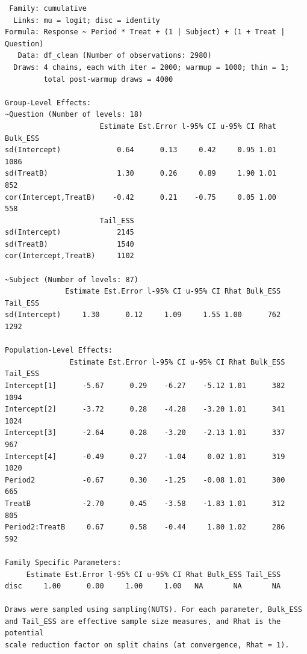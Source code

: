 \documentclass[
  12pt,
  a4paper,
  extrafontsizes,
  onecolumn,
  openright]{memoir}
\begin{document}
\begin{verbatim}
 Family: cumulative 
  Links: mu = logit; disc = identity 
Formula: Response ~ Period * Treat + (1 | Subject) + (1 + Treat | Question) 
   Data: df_clean (Number of observations: 2980) 
  Draws: 4 chains, each with iter = 2000; warmup = 1000; thin = 1;
         total post-warmup draws = 4000

Group-Level Effects: 
~Question (Number of levels: 18) 
                      Estimate Est.Error l-95% CI u-95% CI Rhat Bulk_ESS
sd(Intercept)             0.64      0.13     0.42     0.95 1.01     1086
sd(TreatB)                1.30      0.26     0.89     1.90 1.01      852
cor(Intercept,TreatB)    -0.42      0.21    -0.75     0.05 1.00      558
                      Tail_ESS
sd(Intercept)             2145
sd(TreatB)                1540
cor(Intercept,TreatB)     1102

~Subject (Number of levels: 87) 
              Estimate Est.Error l-95% CI u-95% CI Rhat Bulk_ESS Tail_ESS
sd(Intercept)     1.30      0.12     1.09     1.55 1.00      762     1292

Population-Level Effects: 
               Estimate Est.Error l-95% CI u-95% CI Rhat Bulk_ESS Tail_ESS
Intercept[1]      -5.67      0.29    -6.27    -5.12 1.01      382     1094
Intercept[2]      -3.72      0.28    -4.28    -3.20 1.01      341     1024
Intercept[3]      -2.64      0.28    -3.20    -2.13 1.01      337      967
Intercept[4]      -0.49      0.27    -1.04     0.02 1.01      319     1020
Period2           -0.67      0.30    -1.25    -0.08 1.01      300      665
TreatB            -2.70      0.45    -3.58    -1.83 1.01      312      805
Period2:TreatB     0.67      0.58    -0.44     1.80 1.02      286      592

Family Specific Parameters: 
     Estimate Est.Error l-95% CI u-95% CI Rhat Bulk_ESS Tail_ESS
disc     1.00      0.00     1.00     1.00   NA       NA       NA

Draws were sampled using sampling(NUTS). For each parameter, Bulk_ESS
and Tail_ESS are effective sample size measures, and Rhat is the potential
scale reduction factor on split chains (at convergence, Rhat = 1).
\end{verbatim}
\end{document}
